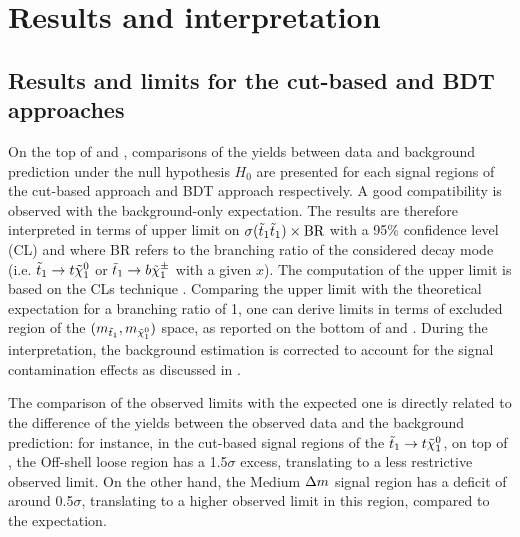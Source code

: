     \section{Results and interpretation \label{sec:analysis_results}}

    \subsection{Results and limits for the cut-based and BDT approaches}

    On the top of  and , comparisons
    of the yields between data and background prediction under the null hypothesis $H_0$
    are presented for each signal regions of the cut-based approach and BDT approach respectively.
    A good compatibility is observed with the background-only expectation. The results
    are therefore interpreted in terms of upper limit on $\sigma(\tilde{t}_1\tilde{t}_1) \times \text{BR}$
    with a 95\% confidence level (CL) and where BR refers to the branching ratio of the
    considered decay mode (i.e. $\tilde{t}_1 \rightarrow t \tilde{\chi}_1^0$ or $\tilde{t}_1 \rightarrow
    b \tilde{\chi}_1^\pm$ with a given $x$). The computation of the upper limit is based on the
    CLs technique \cite{CLs}. Comparing the upper limit with the theoretical
    expectation for a branching ratio of 1, one can derive limits in terms of excluded
    region of the $(m_{\tilde{t}_1}, m_{\tilde{\chi}_1^0})$ space, as reported on the bottom
    of  and . During the interpretation, the
    background estimation is corrected to account for the signal contamination effects
    as discussed in .

    The comparison of the observed limits with the expected one is directly related to
    the difference of the yields between the observed data and the background prediction:
    for instance, in the cut-based signal regions of the $\tilde{t}_1 \rightarrow t \tilde{\chi}_1^0$,
    on top of , the Off-shell loose region has a 1.5$\sigma$ excess,
    translating to a less restrictive observed limit. On the other hand, the Medium $\Delta m$
    signal region has a deficit of around 0.5$\sigma$, translating to a higher observed
    limit in this region, compared to the expectation.

